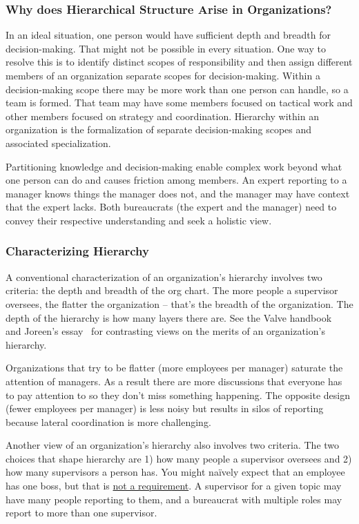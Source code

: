 \subsubsection*{Why does Hierarchical Structure Arise in Organizations?}

In an ideal situation, one person would have sufficient depth and breadth for decision-making. That might not be possible in every situation. One way to resolve this is to identify distinct scopes of responsibility and then assign different members of an organization separate scopes for decision-making. Within a decision-making scope there may be more work than one person can handle, so a team is formed. That team may have some members focused on tactical work and other members focused on strategy and coordination. Hierarchy within an organization is the formalization of separate decision-making scopes and associated specialization. 

Partitioning knowledge and decision-making enable complex work beyond what one person can do and causes friction among members. An expert reporting to a manager knows things the manager does not, and the manager may have context that the expert lacks. Both bureaucrats (the expert and the manager) need to convey their respective understanding and seek a holistic view.

\subsubsection*{Characterizing Hierarchy}

A conventional characterization of an organization's hierarchy involves two criteria: the depth and breadth of the \gls{org chart}.
The more people a supervisor oversees, the flatter the organization -- that's the breadth of the organization. The depth of the hierarchy is how many layers there are. See the Valve handbook~\cite{2012_Valve} and Joreen's essay~\cite{1972_Joreen} for contrasting views on the merits of an organization's hierarchy. 

Organizations that try to be flatter (more employees per manager) saturate the attention of managers. As a result there are more discussions that everyone has to pay attention to so they don't miss something happening. The opposite design (fewer employees per manager) is less noisy but results in silos of reporting because lateral coordination is more challenging.

Another view of an organization's hierarchy also involves two criteria. The two choices that shape hierarchy are 
1) how many people a supervisor oversees and 
2) how many supervisors a person has. 
You might na\"ively expect that an employee has one boss, but that is \href{https://en.wikipedia.org/wiki/Matrix_management}{not a requirement}.%
\iftoggle{WPinmargin}{\marginpar{$>$Wikipedia: Matrix management}}{}
A supervisor for a given topic may have many people reporting to them, and a bureaucrat with multiple roles may report to more than one supervisor.

